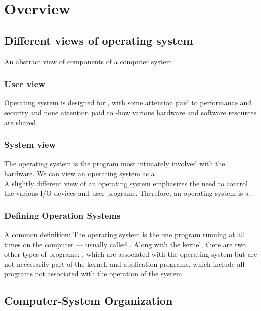 \chapter{Overview}

\section{Different views of operating system}
   
\hf An abstract view of components of a computer system.


\subsection{User view}

\hf Operating system is designed for , with some attention paid
to performance and security and none attention paid to 
-how various hardware and software resources are shared.

\subsection{System view}
\hf The operating system is the program most intimately involved with the hardware. We can view
an operating system as a .\\

A slightly different view of an operating system emphasizes the need to control the various
I/O devices and user programs. Therefore, an operating system is a .

\subsection{Defining Operation Systems}
\hf A common definition: The operating system is the one program running at all times on the 
computer --- usually called . Along with the kernel, there are two other types of 
programs: , which are associated with the operating system but are not necessarily part of the kernel, and application programs, which include all programs
not associated with the operation of the system.

\section{Computer-System Organization}

